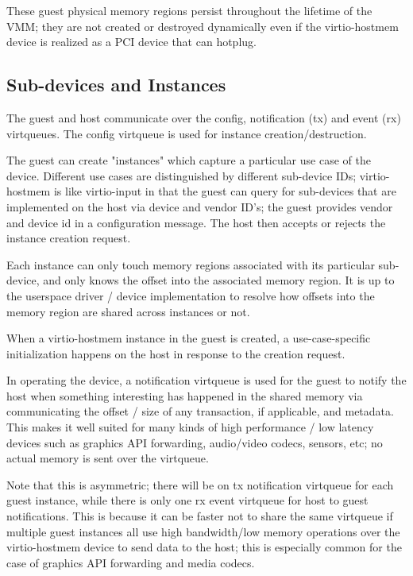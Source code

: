 These guest physical memory regions persist throughout the lifetime of the VMM;
they are not created or destroyed dynamically even if the virtio-hostmem device
is realized as a PCI device that can hotplug.

\subsection{Sub-devices and Instances}\label{sec:Device Types / Host Memory Device / Sub-devices and Instances}

The guest and host communicate
over the config, notification (tx) and event (rx) virtqueues.
The config virtqueue is used for instance creation/destruction.

The guest can create "instances" which capture
a particular use case of the device.
Different use cases are distinguished by different sub-device IDs;
virtio-hostmem is like virtio-input in that the guest can query
for sub-devices that are implemented on the host via device and vendor ID's;
the guest provides vendor and device id in a configuration message.
The host then accepts or rejects the instance creation request.

Each instance can only touch memory regions
associated with its particular sub-device,
and only knows the offset into the associated memory region.
It is up to the userspace driver / device implementation to
resolve how offsets into the memory region are shared across instances or not.

When a virtio-hostmem instance in the guest is created,
a use-case-specific initialization happens on the host
in response to the creation request.

In operating the device, a notification virtqueue is used for the guest to notify the host
when something interesting has happened in the shared memory via communicating
the offset / size of any transaction, if applicable, and metadata.
This makes it well suited for many kinds of high performance / low latency
devices such as graphics API forwarding, audio/video codecs, sensors, etc;
no actual memory is sent over the virtqueue.

Note that this is asymmetric;
there will be on tx notification virtqueue for each guest instance,
while there is only one rx event virtqueue for host to guest notifications.
This is because it can be faster not to share the same virtqueue
if multiple guest instances all use high bandwidth/low memory operations
over the virtio-hostmem device to send data to the host;
this is especially common for the case of graphics API forwarding
and media codecs.

